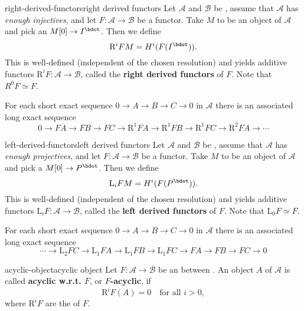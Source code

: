 \begin{topic}{right-derived-functors}{right derived functors}
    Let $\mathcal{A}$ and $\mathcal{B}$ be , assume that $\mathcal{A}$ has \textit{enough injectives}, and let $F : \mathcal{A} \to \mathcal{B}$ be a  functor. Take $M$ to be an object of $\mathcal{A}$ and pick an  $M[0] \to I^\bdot$. Then we define
    \[ \text{R}^i F M = H^i(F(I^\bdot)) . \]
    This is well-defined (independent of the chosen resolution) and yields additive functors $\text{R}^i F : \mathcal{A} \to \mathcal{B}$, called the \textbf{right derived functors} of $F$. Note that $R^0 F \simeq F$.
    
    For each short exact sequence $0 \to A \to B \to C \to 0$ in $\mathcal{A}$ there is an associated long exact sequence
    \[ 0 \to FA \to FB \to FC \to \text{R}^1FA \to \text{R}^1FB \to \text{R}^1FC \to \text{R}^2FA \to \cdots \]
\end{topic}

\begin{topic}{left-derived-functors}{left derived functors}
    Let $\mathcal{A}$ and $\mathcal{B}$ be , assume that $\mathcal{A}$ has \textit{enough projectives}, and let $F : \mathcal{A} \to \mathcal{B}$ be a  functor. Take $M$ to be an object of $\mathcal{A}$ and pick a  $M[0] \to P^\bdot$. Then we define
    \[ \text{L}_i F M = H^i(F(P^\bdot)) . \]
    This is well-defined (independent of the chosen resolution) and yields additive functors $\text{L}_i F : \mathcal{A} \to \mathcal{B}$, called the \textbf{left derived functors} of $F$. Note that $\text{L}_0 F \simeq F$.
    
    For each short exact sequence $0 \to A \to B \to C \to 0$ in $\mathcal{A}$ there is an associated long exact sequence
    \[ \cdots \to \text{L}_2FC \to \text{L}_1FA \to \text{L}_1FB \to \text{L}_1FC \to FA \to FB \to FC \to 0 \]
\end{topic}

\begin{topic}{acyclic-object}{acyclic object}
    Let $F : \mathcal{A} \to \mathcal{B}$ be an  between . An object $A$ of $\mathcal{A}$ is called \textbf{acyclic w.r.t. $F$}, or \textbf{$F$-acyclic}, if
    \[ \text{R}^iF(A) = 0 \quad \text{for all } i > 0, \]
    where $\text{R}^i F$ are the  of $F$.
\end{topic}

